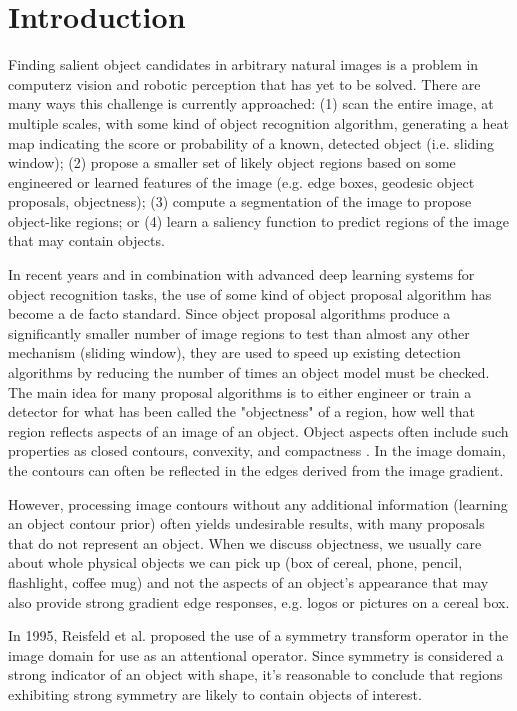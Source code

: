 \section{Introduction}
\label{sec:intro}
Finding salient object candidates in arbitrary natural images is a problem in computerz vision and robotic perception that has yet to be solved. There are many ways this challenge is currently approached: (1) scan the entire image, at multiple scales, with some kind of object recognition algorithm, generating a heat map indicating the score or probability of a known, detected object (i.e. sliding window); (2) propose a smaller set of likely object regions based on some engineered or learned features of the image (e.g. edge boxes, geodesic object proposals, objectness); (3) compute a segmentation of the image to propose object-like regions; or (4) learn a saliency function to predict regions of the image that may contain objects.

In recent years and in combination with advanced deep learning systems for object recognition tasks, the use of some kind of object proposal algorithm has become a de facto standard. Since object proposal algorithms produce a significantly smaller number of image regions to test than almost any other mechanism (\eg sliding window), they are used to speed up existing detection algorithms by reducing the number of times an object model must be checked. The main idea for many proposal algorithms is to either engineer or train a detector for what has been called the "objectness" of a region, \ie how well that region reflects aspects of an image of an object. Object aspects often include such properties as closed contours, convexity, and compactness \cite{koffka_principles_1935}. In the image domain, the contours can often be reflected in the edges derived from the image gradient.

However, processing image contours without any additional information (\eg learning an object contour prior) often yields undesirable results, with many proposals that do not represent an object. When we discuss objectness, we usually care about whole physical objects we can pick up (box of cereal, phone, pencil, flashlight, coffee mug) and not the aspects of an object's appearance that may also provide strong gradient edge responses, e.g. logos or pictures on a cereal box.

In 1995, Reisfeld et al. proposed the use of a symmetry transform operator\cite{reisfeld_robust_1992} in the image domain for use as an attentional operator. Since symmetry is considered a strong indicator of an object with shape\cite{dickinson_symmetry_2013}, it's reasonable to conclude that regions exhibiting strong symmetry are likely to contain objects of interest.

